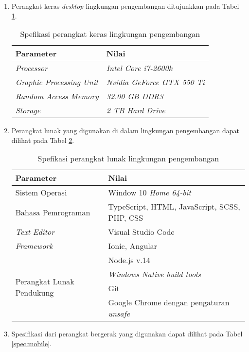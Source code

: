 \begin{enumerate}
\item Perangkat keras \textit{desktop} lingkungan pengembangan ditujunkkan pada Tabel \ref{spec:hardware:desktop}. 

\begin{table}[ht]
\caption{Spefikasi perangkat keras lingkungan pengembangan}
\centering
\begin{tabular}{|l | l |}
\hline
\textbf{Parameter} & \textbf{Nilai} \\  \hline
\textit{Processor}  &  \textit{Intel Core i7-2600k } \\ \hline
\textit{Graphic Processing Unit} & \textit{Nvidia GeForce GTX 550 Ti} \\ \hline
\textit{Random Access Memory}&  \textit{32.00 GB DDR3} \\ \hline
\textit{Storage} & \textit{2 TB Hard Drive} \\ 
\hline
\end{tabular}
\label{spec:hardware:desktop}
\end{table}

\item Perangkat lunak yang digunakan di dalam lingkungan pengembangan dapat dilihat pada Tabel \ref{spec:software}.

\begin{table}[ht]
\caption{Spefikasi perangkat lunak lingkungan pengembangan}
\centering
\begin{tabular}{|l | l |}
\hline
\textbf{Parameter} & \textbf{Nilai} \\ \hline
Sistem Operasi  &  Window 10 \textit{Home 64-bit} \\ \hline
Bahasa Pemrograman & TypeScript, HTML, JavaScript, SCSS, PHP, CSS \\ \hline
\textit{Text Editor} &  Visual Studio Code \\ \hline
\textit{Framework} & Ionic, Angular \\ \hline
\multirow{4}{*}{Perangkat Lunak Pendukung} &  Node.js v.14 \\ & \textit{Windows Native build tools}\\ &  Git \\ & Google Chrome dengan pengaturan \textit{unsafe} \\ 
\hline
\end{tabular}
\label{spec:software}
\end{table}

\item Spesifikasi dari perangkat bergerak yang digunakan dapat dilihat pada Tabel \ref{spec:mobile}.


\end{enumerate}
